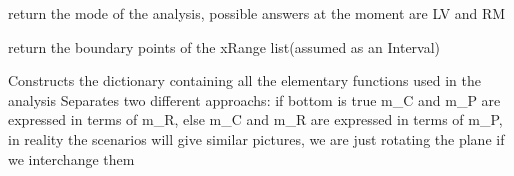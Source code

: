 \documentclass[letterpaper,10pt,english]{sphinxmanual}
\begin{document}
\begin{fulllineitems}

\begin{fulllineitems}
\label{Analisis/Baseclass:Baseclass.BSR.getmode}
return the mode of the analysis, possible answers at the moment are LV and RM

\end{fulllineitems}


\begin{fulllineitems}
\label{Analisis/Baseclass:Baseclass.BSR.getxLims}
return the boundary points of the xRange list(assumed as an Interval)

\end{fulllineitems}


\begin{fulllineitems}
\label{Analisis/Baseclass:Baseclass.BSR.setInvFunctions}
\end{fulllineitems}


\begin{fulllineitems}
\label{Analisis/Baseclass:Baseclass.BSR.setfDict}
Constructs the dictionary containing all the elementary functions used in the analysis
Separates two different approachs:
if bottom is true  m\_C and m\_P are expressed in terms of m\_R, else m\_C and m\_R are expressed in terms of m\_P, in reality the scenarios will give
similar pictures, we are just rotating the plane if we interchange them

\end{fulllineitems}


\begin{fulllineitems}
\label{Analisis/Baseclass:Baseclass.BSR.setxFocus}
\end{fulllineitems}


\begin{fulllineitems}
\label{Analisis/Baseclass:Baseclass.BSR.setxFocusSep}
\end{fulllineitems}


\end{fulllineitems}
\end{document}
